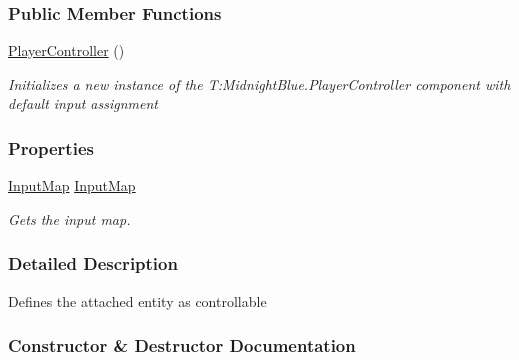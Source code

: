 \subsubsection*{Public Member Functions}
\begin{DoxyCompactItemize}
\item 
\hyperlink{class_m_b2_d_1_1_entity_component_1_1_player_controller_a184bfa3263b42a02f48035ae4acfba02}{Player\+Controller} ()
\begin{DoxyCompactList}\small\item\em Initializes a new instance of the T\+:\+Midnight\+Blue.\+Player\+Controller component with default input assignment \end{DoxyCompactList}\end{DoxyCompactItemize}
\subsubsection*{Properties}
\begin{DoxyCompactItemize}
\item 
\hyperlink{class_m_b2_d_1_1_i_o_1_1_input_map}{Input\+Map} \hyperlink{class_m_b2_d_1_1_entity_component_1_1_player_controller_a5fd930f90d72b416721ac93d9a81bc6d}{Input\+Map}
\begin{DoxyCompactList}\small\item\em Gets the input map. \end{DoxyCompactList}\end{DoxyCompactItemize}


\subsubsection{Detailed Description}
Defines the attached entity as controllable 



\subsubsection{Constructor \& Destructor Documentation}
\hypertarget{class_m_b2_d_1_1_entity_component_1_1_player_controller_a184bfa3263b42a02f48035ae4acfba02}{}\label{class_m_b2_d_1_1_entity_component_1_1_player_controller_a184bfa3263b42a02f48035ae4acfba02} 
